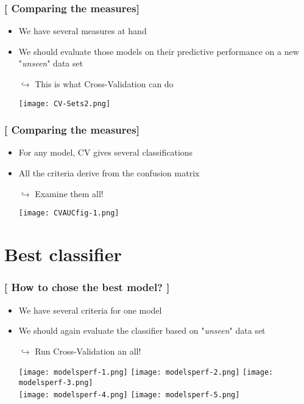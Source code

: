 \documentclass[xcolor=x11names,compress, handhouts]{beamer}
\renewcommand{\(}{\begin{columns}}
\renewcommand{\)}{\end{columns}}
\newcommand{\<}[1]{\begin{column}{#1}}
\renewcommand{\>}{\end{column}}
\begin{document}
\begin{frame} %
\frametitle{\textcolor{brique}{[ Comparing the measures]}}
\pause
 \begin{itemize}[<+->]
  \item We have several measures at hand
  \item  We should evaluate those models on their predictive performance on a new "\textit{unseen}" data set
  \item[$\hookrightarrow$] This is what Cross-Validation can do
   \item[]\texttt{[image: CV-Sets2.png]}
\end{itemize}
\end{frame}


\begin{frame} %
\frametitle{\textcolor{brique}{[ Comparing the measures]}}
\pause
 \begin{itemize}[<+->]
  \item For any model, CV gives several classifications
  \item  All the criteria  derive from the confusion matrix
  \item[$\hookrightarrow$] Examine them all!
   \item[]\texttt{[image: CVAUCfig-1.png]}
\end{itemize}
\end{frame}


\section{Best classifier}



\begin{frame} %
\frametitle{\textcolor{brique}{[ How to chose the best model? ]}}
\pause
 \begin{itemize}[<+->]
  \item We have several criteria for one model
  \item  We should again  evaluate the classifier based  on   "\textit{unseen}" data set
  \item[$\hookrightarrow$] Run Cross-Validation an all!
   \item[]\texttt{[image: modelsperf-1.png]} \texttt{[image: modelsperf-2.png]} \texttt{[image: modelsperf-3.png]} \\
   \texttt{[image: modelsperf-4.png]} \texttt{[image: modelsperf-5.png]}
\end{itemize}
\end{frame}
\end{document}
